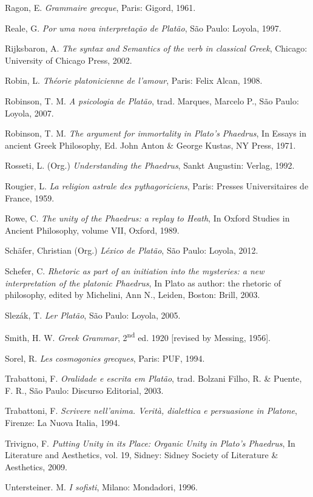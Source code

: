 Ragon, E. \emph{Grammaire grecque}, Paris: Gigord, 1961.

Reale, G. \emph{Por uma nova interpretação de Platão}, São Paulo:
Loyola, 1997.

Rijksbaron, A. \emph{The syntax and Semantics of the verb in classical
Greek}, Chicago: University of Chicago Press, 2002.

Robin, L. \emph{Théorie platonicienne de l'amour}, Paris: Felix Alcan,
1908.

Robinson, T. M. \emph{A psicologia de Platão}, trad. Marques, Marcelo
P., São Paulo: Loyola, 2007.

Robinson, T. M. \emph{The argument for immortality in Plato's}
\emph{Phaedrus}, In Essays in ancient Greek Philosophy, Ed. John Anton
\& George Kustas, NY Press, 1971.

Rosseti, L. (Org.) \emph{Understanding the Phaedrus}, Sankt Augustin:
Verlag, 1992.

Rougier, L. \emph{La religion astrale des pythagoriciens}, Paris:
Presses Universitaires de France, 1959.

Rowe, C. \emph{The unity of the Phaedrus: a replay to Heath}, In Oxford
Studies in Ancient Philosophy, volume VII, Oxford, 1989.

Schäfer, Christian (Org.) \emph{Léxico de Platão}, São Paulo: Loyola,
2012.

Schefer, C. \emph{Rhetoric as part of an initiation into the mysteries:
a new interpretation of the platonic Phaedrus}, In Plato as author: the
rhetoric of philosophy, edited by Michelini, Ann N., Leiden, Boston:
Brill, 2003.

Slezák, T. \emph{Ler Platão}, São Paulo: Loyola, 2005.

Smith, H. W. \emph{Greek Grammar}, 2\textsuperscript{nd} ed. 1920
{[}revised by Messing, 1956{]}.

Sorel, R. \emph{Les cosmogonies grecques}, Paris: PUF, 1994.

Trabattoni, F. \emph{Oralidade e escrita em Platão}, trad. Bolzani
Filho, R. \& Puente, F. R., São Paulo: Discurso Editorial, 2003.

Trabattoni, F. \emph{Scrivere nell'anima. Verità, dialettica e
persuasione in Platone}, Firenze: La Nuova Italia, 1994.

Trivigno, F. \emph{Putting Unity in its Place: Organic Unity in Plato's
Phaedrus}, In Literature and Aesthetics, vol. 19, Sidney: Sidney Society
of Literature \& Aesthetics, 2009.

Untersteiner. M. \emph{I sofisti}, Milano: Mondadori, 1996.

